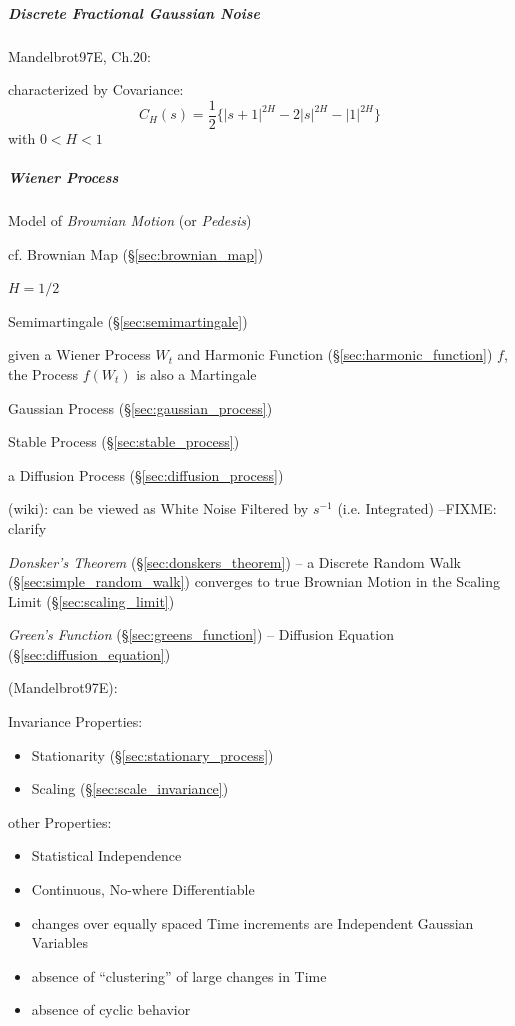 \subparagraph{Discrete Fractional Gaussian Noise}\label{sec:dfgn}\hfill

Mandelbrot97E, Ch.20:

characterized by Covariance:
\[
  C_H(s) = \frac{1}{2} \{ |s+1|^{2H} - 2|s|^{2H} - |1|^{2H} \}
\]
with $0 < H < 1$



\subparagraph{Wiener Process}\label{sec:wiener_process}\hfill

Model of \emph{Brownian Motion} (or \emph{Pedesis})

\fist cf. Brownian Map (\S\ref{sec:brownian_map})

$H = 1/2$

Semimartingale (\S\ref{sec:semimartingale})

given a Wiener Process $W_t$ and Harmonic Function
(\S\ref{sec:harmonic_function}) $f$, the Process $f(W_t)$ is also a Martingale

Gaussian Process (\S\ref{sec:gaussian_process})

Stable Process (\S\ref{sec:stable_process})

a Diffusion Process (\S\ref{sec:diffusion_process})

(wiki):
can be viewed as White Noise Filtered by $s^{-1}$ (i.e. Integrated)
--FIXME: clarify

\emph{Donsker's Theorem} (\S\ref{sec:donskers_theorem}) -- a Discrete Random
Walk (\S\ref{sec:simple_random_walk}) converges to true Brownian Motion in the
Scaling Limit (\S\ref{sec:scaling_limit})

\emph{Green's Function} (\S\ref{sec:greens_function}) -- Diffusion Equation
(\S\ref{sec:diffusion_equation})

(Mandelbrot97E):

Invariance Properties:
\begin{itemize}
  \item Stationarity (\S\ref{sec:stationary_process})
  \item Scaling (\S\ref{sec:scale_invariance})
\end{itemize}

other Properties:
\begin{itemize}
  \item Statistical Independence
  \item Continuous, No-where Differentiable
  \item changes over equally spaced Time increments are Independent Gaussian
    Variables
  \item absence of ``clustering'' of large changes in Time
  \item absence of cyclic behavior
\end{itemize}

